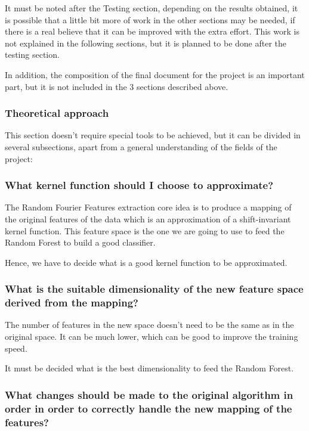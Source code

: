 \documentclass[a4paper]{article}
\begin{document}
        It must be noted after the Testing section, depending on the results obtained, it is possible that a little bit more of work in the other sections may be needed, if there is a real believe that it can be improved with the extra effort. This work is not explained in the following sections, but it is planned to be done after the testing section.

        In addition, the composition of the final document for the project is an important part, but it is not included in the 3 sections described above.

            \subsubsection{Theoretical approach}
            This section doesn't require special tools to be achieved, but it can be divided in several subsections, apart from a general understanding of the fields of the project:

                \subsubsection*{What kernel function should I choose to approximate?}

                The Random Fourier Features extraction core idea is to produce a mapping of the original features of the data which is an approximation of a shift-invariant kernel function. This feature space is the one we are going to use to feed the Random Forest to build a good classifier.

                Hence, we have to decide what is a good kernel function to be approximated.

                \subsubsection*{What is the suitable dimensionality of the new feature space derived from the mapping?}

                The number of features in the new space doesn't need to be the same as in the original space. It can be much lower, which can be good to improve the training speed.

                It must be decided what is the best dimensionality to feed the Random Forest.

                \subsubsection*{What changes should be made to the original algorithm in order in order to correctly handle the new mapping of the features?}
\end{document}
